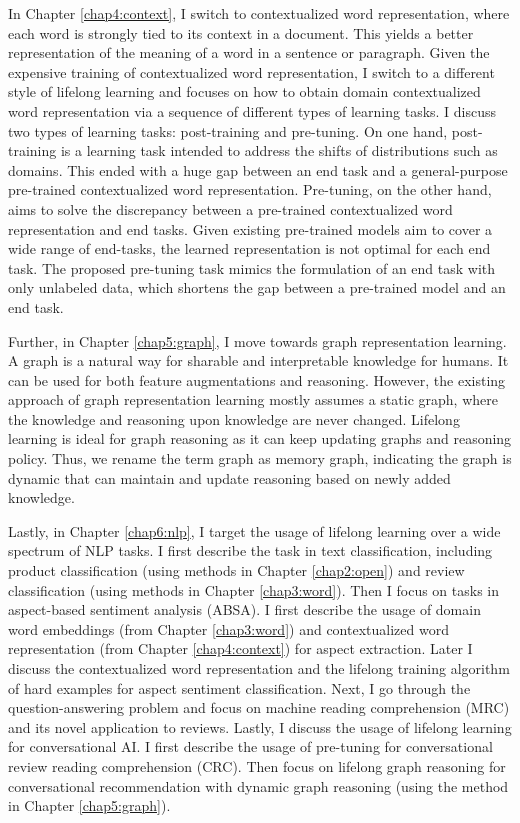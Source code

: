 In Chapter \ref{chap4:context}, I switch to contextualized word representation, where each word is strongly tied to its context in a document.
This yields a better representation of the meaning of a word in a sentence or paragraph.
Given the expensive training of contextualized word representation, I switch to a different style of lifelong learning and focuses on how to obtain domain contextualized word representation via a sequence of different types of learning tasks.
I discuss two types of learning tasks: post-training and pre-tuning.
On one hand, post-training is a learning task intended to address the shifts of distributions such as domains.
This ended with a huge gap between an end task and a general-purpose pre-trained contextualized word representation. 
Pre-tuning, on the other hand, aims to solve the discrepancy between a pre-trained contextualized word representation and end tasks.
Given existing pre-trained models aim to cover a wide range of end-tasks, the learned representation is not optimal for each end task.
The proposed pre-tuning task mimics the formulation of an end task with only unlabeled data, which shortens the gap between a pre-trained model and an end task.

Further, in Chapter \ref{chap5:graph}, I move towards graph representation learning.
A graph is a natural way for sharable and interpretable knowledge for humans.
It can be used for both feature augmentations and reasoning.
However, the existing approach of graph representation learning mostly assumes a static graph, where the knowledge and reasoning upon knowledge are never changed.
Lifelong learning is ideal for graph reasoning as it can keep updating graphs and reasoning policy.
Thus, we rename the term graph as memory graph, indicating the graph is dynamic that can maintain and update reasoning based on newly added knowledge.

Lastly, in Chapter \ref{chap6:nlp}, I target the usage of lifelong learning over a wide spectrum of NLP tasks.
I first describe the task in text classification, including product classification (using methods in Chapter \ref{chap2:open}) and review classification (using methods in Chapter \ref{chap3:word}).
Then I focus on tasks in aspect-based sentiment analysis (ABSA).
I first describe the usage of domain word embeddings (from Chapter \ref{chap3:word}) and contextualized word representation (from Chapter \ref{chap4:context}) for aspect extraction.
Later I discuss the contextualized word representation and the lifelong training algorithm of hard examples for aspect sentiment classification.
Next, I go through the question-answering problem and focus on machine reading comprehension (MRC) and its novel application to reviews.
Lastly, I discuss the usage of lifelong learning for conversational AI. 
I first describe the usage of pre-tuning for conversational review reading comprehension (CRC).
Then focus on lifelong graph reasoning for conversational recommendation with dynamic graph reasoning (using the method in Chapter \ref{chap5:graph}).

